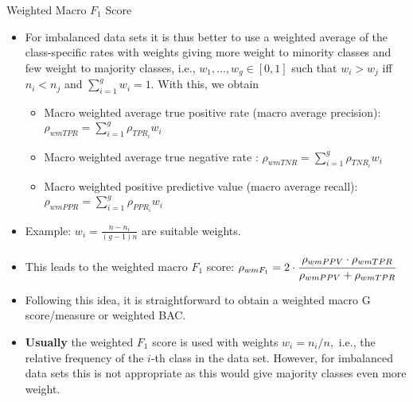 \begin{vbframe}{Weighted Macro $F_1$ Score}
	\footnotesize{
	\begin{itemize}
%		
		\item For imbalanced data sets it is thus better to use a weighted average of the class-specific rates with weights giving more weight to minority classes and few weight to majority classes, i.e., $w_1,\ldots,w_g \in[0,1]$  such that $w_i > w_j$ iff $n_i < n_j$ and $\sum_{i=1}^g w_i = 1.$
%		
		With this, we obtain
		\begin{itemize}
			\footnotesize
			\item Macro weighted average true positive rate (macro average precision): $\rho_{wmTPR} = \sum_{i=1}^g  \rho_{TPR_i} w_i$
			\item Macro weighted average true negative rate : $\rho_{wmTNR} = \sum_{i=1}^g  \rho_{TNR_i} w_i$
			\item Macro weighted positive predictive value (macro average recall): $\rho_{wmPPR} = \sum_{i=1}^g  \rho_{PPR_i} w_i$
		\end{itemize}
%	 
		\item Example: $w_i = \frac{n - n_i}{(g-1)n}$ are suitable weights.
		\item This leads to the weighted macro $F_1$ score:
		$\rho_{wmF_1} = 2 \cdot \cfrac{\rho_{wmPPV} \cdot \rho_{wmTPR}}{\rho_{wmPPV} + 
			\rho_{wmTPR}}$
		\item Following this idea, it is straightforward to obtain a weighted macro G score/measure or weighted BAC.
%		
		\item \textbf{Usually} the weighted $F_1$ score is used with weights $w_i = n_i/n,$ i.e., the relative frequency of the $i$-th class in the data set. However, for imbalanced data sets  this is not appropriate as this would give majority classes even more weight.
%
	\end{itemize}
	}
\end{vbframe}


